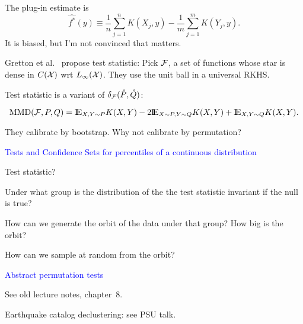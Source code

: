 \documentclass[landscape]{slides}
\newcommand{\EE}{\hbox{I\kern-.1667em\hbox{E}}}
\newcommand{\cF}{{\cal F}}
\newcommand{\cX}{{\cal X}}
\newcommand{\beq}{\begin{equation}}
\newcommand{\eeq}{\end{equation}}
\begin{document}
\begin{slide}
\begin{slide}
The plug-in estimate is 
\beq
   \hat{f^*}(y) \equiv \frac{1}{n} \sum_{j=1}^n K(X_j, y) - \frac{1}{m} \sum_{j=1}^m K(Y_j, y).
\eeq
It is biased, but I'm not convinced that matters.
\end{slide}


\begin{slide}
Gretton et al.~\cite{grettonEtal08} propose test statistic: Pick $\cF$,
a set of functions whose star is dense in $C(\cX)$ wrt $L_\infty(\cX)$. 
They use the unit ball in a universal RKHS. 

Test statistic is a variant of $\delta_\cF (\hat{P}, \hat{Q})$:

\beq
   \mbox{MMD}(\cF, P, Q) =
   \EE_{X,Y \sim P} K(X, Y) - 2\EE_{X \sim P, Y \sim Q} K(X, Y) + \EE_{X, Y \sim Q} K(X, Y).
\eeq

\end{slide}

\begin{slide}


They calibrate by bootstrap.  Why not calibrate by permutation?
\end{slide}


\begin{slide}
{\textcolor{blue}{Tests and Confidence Sets for percentiles of a continuous distribution}}

Test statistic?

Under what group is the distribution of the the test statistic invariant if the null is true?

How can we generate the orbit of the data under that group?  How big is the orbit?

How can we sample at random from the orbit?

\end{slide}



\begin{slide}
{\textcolor{blue}{Abstract permutation tests}}

See old lecture notes, chapter~8.

Earthquake catalog declustering: see PSU talk.

\end{slide}



\end{slide}
\end{document}
